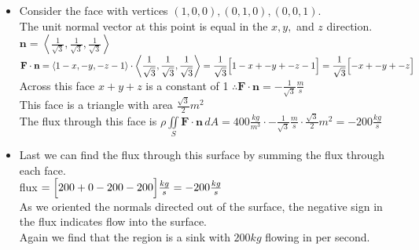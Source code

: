 \documentclass[10pt]{article}
\begin{document}
\begin{itemize}
    \subitem $ \displaystyle \textbf{n} = \left< -1,0,0 \right> $ \\
    \subitem $ \displaystyle \textbf{F} \cdot \textbf{n} = \left<1-x,-y,-z-1\right> \cdot \left< 0,0,-1 \right> = x - 1 $ \\
    \subitem Across this face $ x $ is a constant of 0 $ \therefore \textbf{F} \cdot \textbf{n} = -1 $ \\
    \subitem This face is a triangle with area $ \displaystyle \frac{1}{2}m^2 $ \\
    \subitem The flux through this face is $ \displaystyle \rho \iint \limits_{S} \textbf{F} \cdot \textbf{n} \, dA = 400\tfrac{kg}{s} \cdot -1\tfrac{m}{s} \cdot \frac{1}{2}m^2 = -200\tfrac{kg}{s} $ \\
    \item Consider the face with vertices $ (1,0,0), (0,1,0), (0,0,1) $. \\
    \subitem The unit normal vector at this point is equal in the $ x,y, $ and $ z $ direction. \\
    \subitem $ \displaystyle \textbf{n} = \left< \frac{1}{\sqrt{3}},\frac{1}{\sqrt{3}},\frac{1}{\sqrt{3}} \right> $ \\
    \subitem $ \displaystyle \textbf{F} \cdot \textbf{n} = \left<1-x,-y,-z-1\right> \cdot \left< \frac{1}{\sqrt{3}},\frac{1}{\sqrt{3}},\frac{1}{\sqrt{3}} \right> =\frac{1}{\sqrt{3}} \Bigl[ 1-x+-y+-z-1 \Bigr] =\frac{1}{\sqrt{3}} \Bigl[ -x+-y+-z \Bigr] $ \\
    \subitem Across this face $ x + y + z $ is a constant of 1 $ \therefore \textbf{F} \cdot \textbf{n} = - \frac{1}{\sqrt{3}}\tfrac{m}{s} $ \\
    \subitem This face is a triangle with area $ \displaystyle \frac{\sqrt{3}}{2}m^2 $ \\
    \subitem The flux through this face is $ \displaystyle \rho \iint \limits_{S} \textbf{F} \cdot \textbf{n} \, dA = 400\tfrac{kg}{m^3} \cdot -\frac{1}{\sqrt{3}}\tfrac{m}{s} \cdot \frac{\sqrt{3}}{2}m^2 = -200\tfrac{kg}{s} $ \\
    \item Last we can find the flux through this surface by summing the flux through each face. \\
    \subitem flux $ \displaystyle = \Bigl[200 + 0 -200 -200\Bigr]\tfrac{kg}{s} = -200\tfrac{kg}{s} $ \\
    \subitem As we oriented the normals directed out of the surface, the negative sign in the flux indicates flow into the surface. \\
    \subitem Again we find that the region is a sink with $ 200kg $ flowing in per second. \\
\end{itemize}
\end{document}
